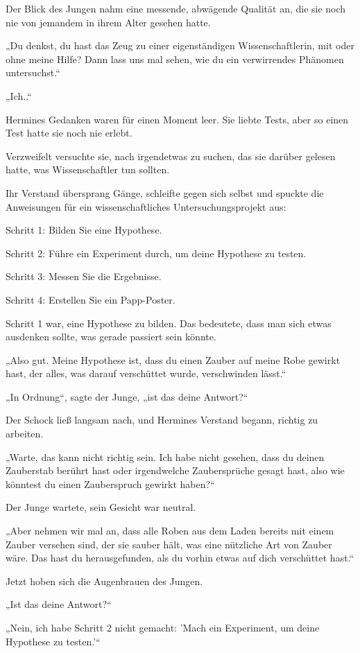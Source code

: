 {Der Blick des Jungen nahm eine messende, abwägende Qualität an, die sie noch nie von jemandem in ihrem Alter gesehen hatte.

„Du denkst, du hast das Zeug zu einer eigenständigen Wissenschaftlerin, mit oder ohne meine Hilfe? Dann lass uns mal sehen, wie du ein verwirrendes Phänomen untersuchst.“

„Ich..“

Hermines Gedanken waren für einen Moment leer. Sie liebte Tests, aber so einen Test hatte sie noch nie erlebt.

Verzweifelt versuchte sie, nach irgendetwas zu suchen, das sie darüber gelesen hatte, was Wissenschaftler tun sollten.

Ihr Verstand übersprang Gänge, schleifte gegen sich selbst und spuckte die Anweisungen für ein wissenschaftliches Untersuchungsprojekt aus:

Schritt 1: Bilden Sie eine Hypothese.

Schritt 2: Führe ein Experiment durch, um deine Hypothese zu testen.

Schritt 3: Messen Sie die Ergebnisse.

Schritt 4: Erstellen Sie ein Papp-Poster.

Schritt 1 war, eine Hypothese zu bilden. Das bedeutete, dass man sich etwas ausdenken sollte, was gerade passiert sein könnte.

„Also gut. Meine Hypothese ist, dass du einen Zauber auf meine Robe gewirkt hast, der alles, was darauf verschüttet wurde, verschwinden lässt.“

„In Ordnung“, sagte der Junge, „ist das deine Antwort?“

Der Schock ließ langsam nach, und Hermines Verstand begann, richtig zu arbeiten.

„Warte, das kann nicht richtig sein. Ich habe nicht gesehen, dass du deinen Zauberstab berührt hast oder irgendwelche Zaubersprüche gesagt hast, also wie könntest du einen Zauberspruch gewirkt haben?“

Der Junge wartete, sein Gesicht war neutral.

„Aber nehmen wir mal an, dass alle Roben aus dem Laden bereits mit einem Zauber versehen sind, der sie sauber hält, was eine nützliche Art von Zauber wäre. Das hast du herausgefunden, als du vorhin etwas auf dich verschüttet hast.“

Jetzt hoben sich die Augenbrauen des Jungen.

„Ist das deine Antwort?“

„Nein, ich habe Schritt 2 nicht gemacht: 'Mach ein Experiment, um deine Hypothese zu testen.'“

}
